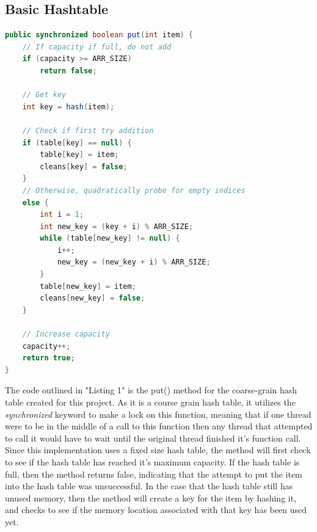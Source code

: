 \documentclass[conference]{IEEEtran}
\begin{document}
\subsection{Basic Hashtable}
\begin{lstlisting}[language={Java},caption=Source code for the course-grain put() method.,captionpos=b,breaklines=true,frame=single]
public synchronized boolean put(int item) {
    // If capacity if full, do not add
    if (capacity >= ARR_SIZE)
        return false;

    // Get key
    int key = hash(item);

    // Check if first try addition
    if (table[key] == null) {
        table[key] = item;
        cleans[key] = false;
    }
    // Otherwise, quadratically probe for empty indices
    else {
        int i = 1;
        int new_key = (key + i) % ARR_SIZE;
        while (table[new_key] != null) {
            i++;
            new_key = (new_key + i) % ARR_SIZE;
        }
        table[new_key] = item;
        cleans[new_key] = false;
    }

    // Increase capacity
    capacity++;
    return true;
}
\end{lstlisting}

The code outlined in "Listing 1" is the put() method for the coarse-grain hash table created for this project. As it is a course grain hash table,
it utilizes the \emph{synchronized} keyword to make a lock on this function, meaning that if one thread were to be in the middle of a call to this function
then any thread that attempted to call it would have to wait until the original thread finished it's function call. Since this implementation uses a fixed size 
hash table, the method will first check to see if the hash table has reached it's maximum capacity. If the hash table is full, then the method returns false,
indicating that the attempt to put the item into the hash table was unsuccessful. In the case that the hash table still has unused memory, then the method
will create a key for the item by hashing it, and checks to see if the memory location associated with that key has been used yet.
\end{document}
